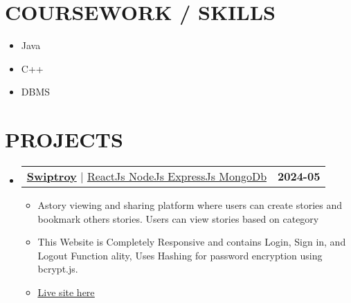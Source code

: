\documentclass[letterpaper,11pt]{article}
\makeatletter
\newcommand{\resumeItem}[1]{
        \item\small{
          {#1 \vspace{-2pt}}
        }
      }
\newcommand{\resumeProjectHeading}[2]{
          \item
          \begin{tabular*}{1.001\textwidth}{l@{\extracolsep{\fill}}r}
            \small#1 & \textbf{\small #2}\\
          \end{tabular*}\vspace{-7pt}
      }
\newcommand{\resumeSubHeadingListStart}{\begin{itemize}[leftmargin=0.0in, label={}]}
\newcommand{\resumeSubHeadingListEnd}{\end{itemize}}
\newcommand{\resumeItemListStart}{\begin{itemize}}
\newcommand{\resumeItemListEnd}{\end{itemize}\vspace{-5pt}}
\makeatother
\begin{document}
        \section{COURSEWORK / SKILLS}
        \begin{multicols}{4}
            \begin{itemize}[itemsep=-2pt, parsep=5pt]
                
                    \item Java
                  
                    \item C++
                  
                    \item DBMS
                  
            \end{itemize}
        \end{multicols}
        \vspace*{2.0\multicolsep}
    
        
\section{PROJECTS}
\vspace{-5pt}
\resumeSubHeadingListStart
  
      \resumeProjectHeading
      {\textbf{\large{\underline{Swiptroy}}} $|$ {\underline{ReactJs NodeJs ExpressJs MongoDb}}}{2024-05}
      \resumeItemListStart
       \resumeItem{\normalsize{Astory viewing and sharing platform  where users can create stories and bookmark  others stories. Users can view stories based  on category}} 
        \resumeItem{\normalsize{ This Website is Completely Responsive and  contains Login, Sign in, and Logout Function ality, Uses Hashing for password encryption  using bcrypt.js.}}
        
        \resumeItem{\href{https://link.com}{\textcolor{accent}{\underline{\normalsize{Live site here}}}}} 
      \resumeItemListEnd
      \vspace{-13pt}
    
     \vspace{13pt}
\resumeSubHeadingListEnd
\vspace{-12pt}

    
         
    
        
    
        
        
    
        
\end{document}

